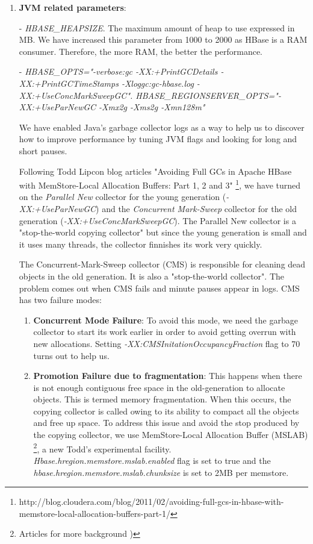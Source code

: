 \begin{enumerate}

\item \textbf{JVM related parameters}:
\bigskip

- \textit{HBASE\_HEAPSIZE}. The maximum amount of heap to use expressed in MB. We have increased this parameter from 1000 to 2000 as HBase is a RAM consumer. Therefore, the more RAM, the better the performance.
\par
- \textit{HBASE\_OPTS="-verbose:gc -XX:+PrintGCDetails -XX:+PrintGCTimeStamps -Xloggc:gc-hbase.log -XX:+UseConcMarkSweepGC".
  HBASE\_REGIONSERVER\_OPTS="-XX:+UseParNewGC -Xmx2g -Xms2g -Xmn128m"}
\par
We have enabled Java's garbage collector logs as a way to help us to discover how to improve performance by tuning JVM flags and looking for long and short pauses. 
\par
Following Todd Lipcon blog articles "Avoiding Full GCs in Apache HBase with MemStore-Local Allocation Buffers: Part 1, 2 and 3" \footnote{http://blog.cloudera.com/blog/2011/02/avoiding-full-gcs-in-hbase-with-memstore-local-allocation-buffers-part-1/}, we have turned on the \textit{Parallel New} collector for the young generation (\textit{-XX:+UseParNewGC}) and the \textit{Concurrent Mark-Sweep} collector for the old generation (\textit{-XX:+UseConcMarkSweepGC}). The Parallel New collector is a "stop-the-world copying collector" but since the young generation is small and it uses many threads, the collector finnishes its work very quickly.
\par
The Concurrent-Mark-Sweep collector (CMS) is responsible for cleaning dead objects in the old generation. It is also a "stop-the-world collector". The problem comes out when CMS fails and minute pauses appear in logs. CMS has two failure modes:
\begin{enumerate}
\item \textbf{Concurrent Mode Failure}: To avoid this mode, we need the garbage collector to start its work earlier in order to avoid getting overrun with new allocations. Setting \textit{-XX:CMSInitationOccupancyFraction} flag to 70 turns out to help us.
\item \textbf{Promotion Failure due to fragmentation}: This happens when there is not enough contiguous free space in the old-generation to allocate objects. This is termed memory fragmentation. When this occurs, the copying collector is called owing to its ability to compact all the objects and free up space. To address this issue and avoid the stop produced by the copying collector, we use MemStore-Local Allocation Buffer (MSLAB) \footnote{Articles for more background \cite{ApacheHBaseMSLAB} \cite{MSLAB})}, a new Todd's experimental facility.  \textit{Hbase.hregion.memstore.mslab.enabled} flag is set to true and the \textit{hbase.hregion.memstore.mslab.chunksize} is set to 2MB per memstore.


\end{enumerate}
\end{enumerate}
